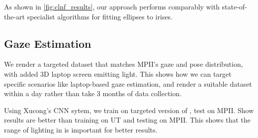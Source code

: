 As shown in \autoref{fig:clnf_results}, our approach performs comparably with state-of-the-art specialist algorithms for fitting ellipses to irises.



\subsection{Gaze Estimation}



We render a targeted dataset that matches MPII's gaze and pose distribution, with added 3D laptop screen emitting light. This shows how we can target specific scenarios like laptop-based gaze estimation, and render a suitable dataset within a day rather than take 3 months of data collection.

Using Xucong's CNN sytem, we train on targeted version of \dataset, test on MPII. Show results are better than training on UT and testing on MPII. This shows that the range of lighting in \dataset is important for better results.


